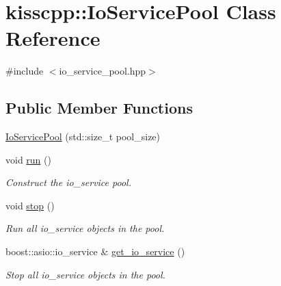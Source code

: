 \hypertarget{classkisscpp_1_1_io_service_pool}{\section{kisscpp\-:\-:Io\-Service\-Pool Class Reference}
\label{classkisscpp_1_1_io_service_pool}
}


{\ttfamily \#include $<$io\-\_\-service\-\_\-pool.\-hpp$>$}

\subsection*{Public Member Functions}
\begin{DoxyCompactItemize}
\item 
\hyperlink{classkisscpp_1_1_io_service_pool_a6d74b5924617a7721e8684e2c96ab62b}{Io\-Service\-Pool} (std\-::size\-\_\-t pool\-\_\-size)
\item 
void \hyperlink{classkisscpp_1_1_io_service_pool_ae5fd122dbb76f19740c3417df884d812}{run} ()
\begin{DoxyCompactList}\small\item\em Construct the io\-\_\-service pool. \end{DoxyCompactList}\item 
void \hyperlink{classkisscpp_1_1_io_service_pool_a683d0e39dabdb14b1c70fb8b7984cfee}{stop} ()
\begin{DoxyCompactList}\small\item\em Run all io\-\_\-service objects in the pool. \end{DoxyCompactList}\item 
boost\-::asio\-::io\-\_\-service \& \hyperlink{classkisscpp_1_1_io_service_pool_af8d6035811fbe50ab2da89595fbc7dbe}{get\-\_\-io\-\_\-service} ()
\begin{DoxyCompactList}\small\item\em Stop all io\-\_\-service objects in the pool. \end{DoxyCompactList}\end{DoxyCompactItemize}


